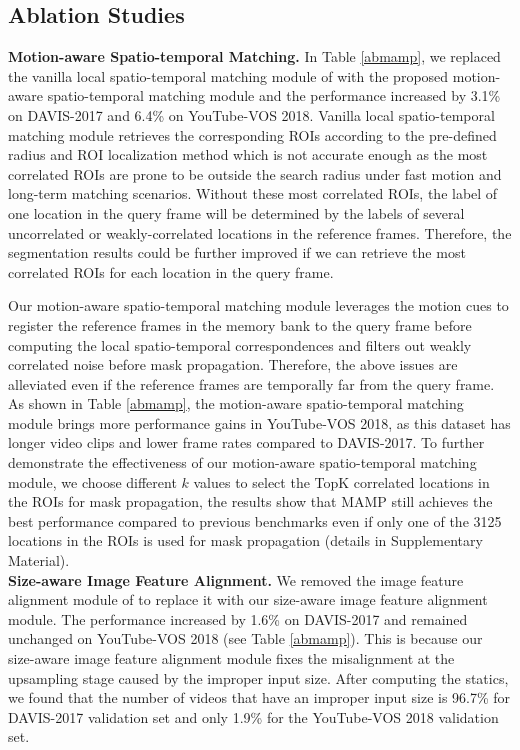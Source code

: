 \documentclass[letterpaper]{article} \usepackage{aaai22}  \usepackage{times}  \usepackage{helvet}  \usepackage{courier}  \usepackage[hyphens]{url}  \usepackage{graphicx} \urlstyle{rm} \def\UrlFont{\rm}  \usepackage{natbib}  \usepackage{caption} \DeclareCaptionStyle{ruled}{labelfont=normalfont,labelsep=colon,strut=off} \frenchspacing  \setlength{\pdfpagewidth}{8.5in}  \setlength{\pdfpageheight}{11in}  \usepackage{algorithm}
\begin{document}
\subsection{Ablation Studies}

\noindent\textbf{Motion-aware Spatio-temporal Matching.}
In Table \ref{abmamp}, we replaced the vanilla local spatio-temporal matching module of \cite{MAST} with the proposed motion-aware spatio-temporal matching module and the performance increased by 3.1\% on DAVIS-2017 and 6.4\% on YouTube-VOS 2018. Vanilla local spatio-temporal matching module retrieves the corresponding ROIs according to the pre-defined radius and ROI localization method which is not accurate enough as the most correlated ROIs are prone to be outside the search radius under fast motion and long-term matching scenarios. Without these most correlated ROIs, the label of one location in the query frame will be determined by the labels of several uncorrelated or weakly-correlated locations in the reference frames. Therefore, the segmentation results could be further improved if we can retrieve the most correlated ROIs for each location in the query frame.

Our motion-aware spatio-temporal matching module leverages the motion cues to register the reference frames in the memory bank to the query frame before computing the local spatio-temporal correspondences and filters out weakly correlated noise before mask propagation. Therefore, the above issues are alleviated even if the reference frames are temporally far from the query frame. As shown in Table \ref{abmamp}, the motion-aware spatio-temporal matching module brings more performance gains in YouTube-VOS 2018, as this dataset has longer video clips and lower frame rates compared to DAVIS-2017. To further demonstrate the effectiveness of our motion-aware spatio-temporal matching module, we choose different $k$ values to select the TopK correlated locations in the ROIs for mask propagation, the results show that MAMP still achieves the best performance compared to previous benchmarks even if only one of the 3125 locations in the ROIs is used for mask propagation (details in Supplementary Material).
\\





\noindent\textbf{Size-aware Image Feature Alignment.}
We removed the image feature alignment module of \cite{MAST} to replace it with our size-aware image feature alignment module. The performance increased by 1.6\% on DAVIS-2017 and remained unchanged on YouTube-VOS 2018 (see Table \ref{abmamp}). This is because our size-aware image feature alignment module fixes the misalignment at the upsampling stage caused by the improper input size. After computing the statics, we found that the number of videos that have an improper input size is 96.7\% for DAVIS-2017 validation set and only 1.9\% for the YouTube-VOS 2018 validation set.
\\
\end{document}
